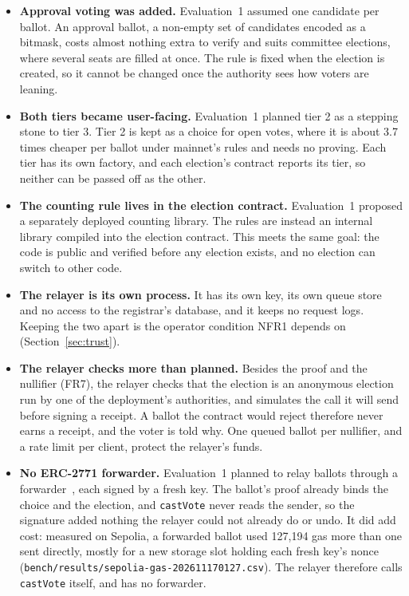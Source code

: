 \begin{itemize}[leftmargin=1.2em,itemsep=3pt,topsep=2pt]
  \item \textbf{Approval voting was added.} Evaluation~1 assumed one candidate
        per ballot. An approval ballot, a non-empty set of candidates encoded
        as a bitmask, costs almost nothing extra to verify and suits committee
        elections, where several seats are filled at once. The rule is fixed
        when the election is created, so it cannot be changed once the
        authority sees how voters are leaning.

  \item \textbf{Both tiers became user-facing.} Evaluation~1 planned tier 2 as
        a stepping stone to tier 3. Tier 2 is kept as a choice for open votes,
        where it is about 3.7 times cheaper per ballot under mainnet's rules and
        needs no proving. Each tier has its own factory, and each election's
        contract reports its tier, so neither can be passed off as the other.

  \item \textbf{The counting rule lives in the election contract.}
        Evaluation~1 proposed a separately deployed counting library. The
        rules are instead an internal library compiled into the election
        contract. This meets the same goal: the code is public and verified
        before any election exists, and no election can switch to other code.

  \item \textbf{The relayer is its own process.} It has its own key, its own
        queue store and no access to the registrar's database, and it keeps no
        request logs. Keeping the two apart is the operator condition NFR1
        depends on (Section~\ref{sec:trust}).

  \item \textbf{The relayer checks more than planned.} Besides the proof
        and the nullifier (FR7), the relayer checks that the election is an
        anonymous \projectname{} election run by one of the deployment's
        authorities, and simulates the call it will send
        before signing a receipt. A ballot the contract would reject
        therefore never earns a receipt, and the voter is told why. One queued
        ballot per nullifier, and a rate limit per client, protect the
        relayer's funds.

  \item \textbf{No ERC-2771 forwarder.} Evaluation~1 planned to relay
        ballots through a forwarder~\cite{erc2771}, each signed by a fresh key.
        The ballot's proof already binds the choice and the election, and
        \texttt{castVote} never reads the sender, so the signature added
        nothing the relayer could not already do or undo. It did add cost:
        measured on Sepolia, a forwarded ballot used 127,194 gas more than one
        sent directly, mostly for a new storage slot holding each fresh key's
        nonce (\texttt{bench/results/sepolia-gas-202611170127.csv}). The relayer
        therefore calls \texttt{castVote} itself, and \projectname{} has no
        forwarder.


\end{itemize}
